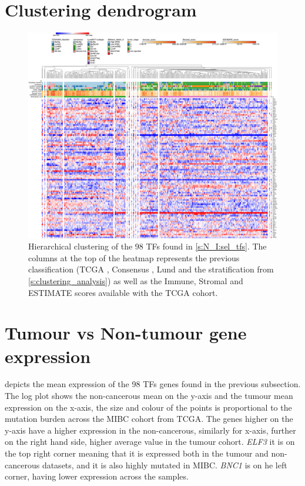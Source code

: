 \section{Clustering dendrogram} \label{s:ap:dendrogram}

\begin{figure}[!htb]   
\centering
\includegraphics[width=1.0\textwidth,keepaspectratio]{Sections/Network_I/Resources/selective_pruning/15_CS_norm_sel_tfs.png}
  \caption{Hierarchical clustering of the 98 TFs found in \cref{s:N_I:sel_tfs}. The columns at the top of the heatmap represents the previous classification (TCGA \cite{Robertson2017-mg}, Consensus \cite{Kamoun2020-tj}, Lund \cite{Marzouka2018-ge} and the stratification from \cref{s:clustering_analysis}) as well as the Immune, Stromal and ESTIMATE scores available with the TCGA cohort.}
\label{fig:ap:morph_sel_tfs}
\end{figure}

\section{Tumour vs Non-tumour gene expression} \label{s:ap:tum_vs_non-tumour}


 depicts the mean expression of the 98 TFs genes found in the previous subsection. The log plot shows the non-cancerous mean on the y-axis and the tumour mean expression on the x-axis, the size and colour of the points is proportional to the mutation burden across the MIBC cohort from TCGA. The genes higher on the y-axis have a higher expression in the non-cancerous, similarly for x-axis, further on the right hand side, higher average value in the tumour cohort. \textit{ELF3} it is on the top right corner meaning that it is expressed both in the tumour and non-cancerous datasets, and it is also highly mutated in MIBC. \textit{BNC1} is on he left corner, having lower expression across the samples.

